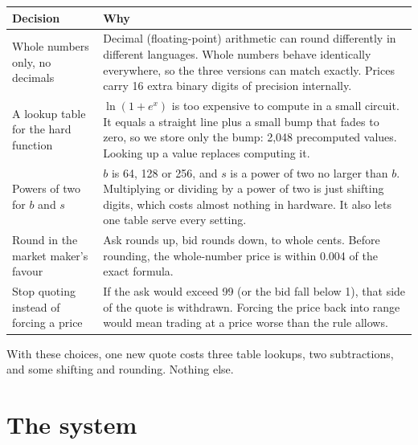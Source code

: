 \documentclass[11pt]{article}
\newcommand{\cent}{\textcent}
\begin{document}
\begin{table}[h]
\centering
\renewcommand{\arraystretch}{1.25}
\begin{tabularx}{\textwidth}{>{\raggedright\arraybackslash}p{}X}
\toprule
\textbf{Decision} & \textbf{Why} \\
\midrule
Whole numbers only, no decimals &
Decimal (floating-point) arithmetic can round differently in different
languages. Whole numbers behave identically everywhere, so the three versions
can match exactly. Prices carry 16 extra binary digits of precision
internally. \\
A lookup table for the hard function &
$\ln(1+e^{x})$ is too expensive to compute in a small circuit. It equals a
straight line plus a small bump that fades to zero, so we store only the bump:
2{,}048 precomputed values. Looking up a value replaces computing it. \\
Powers of two for $b$ and $s$ &
$b$ is 64, 128 or 256, and $s$ is a power of two no larger than $b$.
Multiplying or dividing by a power of two is just shifting digits, which costs
almost nothing in hardware. It also lets one table serve every setting. \\
Round in the market maker's favour &
Ask rounds up, bid rounds down, to whole cents. Before rounding, the
whole-number price is within 0.004\cent{} of the exact formula. \\
Stop quoting instead of forcing a price &
If the ask would exceed 99\cent{} (or the bid fall below 1\cent), that side of
the quote is withdrawn. Forcing the price back into range would mean trading
at a price worse than the rule allows. \\
\bottomrule
\end{tabularx}
\end{table}

With these choices, one new quote costs three table lookups, two subtractions,
and some shifting and rounding. Nothing else.

\section{The system}
\end{document}
